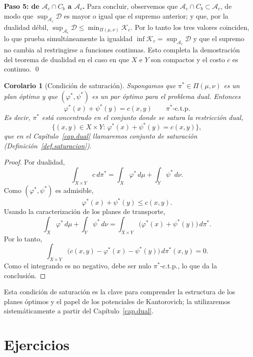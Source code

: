 \documentclass[12pt, a4paper]{amsbook}
\newcommand{\D}{{\mathcal D}}
\newtheorem{cor}[teo]{Corolario}
\theoremstyle{remark}
\theoremstyle{definition}
\numberwithin{section}{chapter}
\numberwithin{subsection}{section}
\numberwithin{equation}{section}
\numberwithin{figure}{chapter}
\begin{document}
\medskip\noindent\textbf{Paso 5: de $\mathcal A_c\cap C_b$ a $\mathcal A_c$.}
Para concluir, observemos que $\mathcal A_c\cap C_b\subset\mathcal A_c$,
de modo que $\sup_{\mathcal A_c}\D$ es mayor o igual que el supremo anterior;
y que, por la dualidad débil, $\sup_{\mathcal A_c}\D\le\min_{\Pi(\mu,\nu)}\mathcal K_c$.
Por lo tanto los tres valores coinciden, lo que prueba simultáneamente la
igualdad $\inf\mathcal K_c=\sup_{\mathcal A_c}\D$ y que el supremo no cambia
al restringirse a funciones continuas. Esto completa la demostración del
teorema de dualidad en el caso en que $X$ e $Y$ son compactos y el costo $c$
es continuo.
\qed

\begin{cor}[Condición de saturación]\label{cor:saturacion}
Supongamos que $\pi^*\in\Pi(\mu,\nu)$ es un plan óptimo y que
$(\varphi^*,\psi^*)$ es un par óptimo para el problema dual. Entonces
\[
\varphi^*(x)+\psi^*(y)=c(x,y)
\qquad \pi^*\text{-c.t.p.}
\]
Es decir, $\pi^*$ está concentrado en el conjunto donde se satura la
restricción dual,
\[
\bigl\{(x,y)\in X\times Y:\,
\varphi^*(x)+\psi^*(y)=c(x,y)\bigr\},
\]
que en el Capítulo~\ref{cap.dual} llamaremos \emph{conjunto de saturación}
(Definición~\ref{def.saturacion}).
\end{cor}

\begin{proof}
Por dualidad,
\[
\int_{X\times Y}c\,d\pi^*
=
\int_X\varphi^*\,d\mu
+
\int_Y\psi^*\,d\nu.
\]
Como $(\varphi^*,\psi^*)$ es admisible,
\[
\varphi^*(x)+\psi^*(y)\leq c(x,y).
\]
Usando la caracterización de los planes de transporte,
\[
\int_X\varphi^*\,d\mu+\int_Y\psi^*\,d\nu
=
\int_{X\times Y}
\bigl(\varphi^*(x)+\psi^*(y)\bigr)\,d\pi^*.
\]
Por lo tanto,
\[
\int_{X\times Y}
\bigl(c(x,y)-\varphi^*(x)-\psi^*(y)\bigr)
\,d\pi^*(x,y)
=0.
\]
Como el integrando es no negativo, debe ser nulo $\pi^*$-c.t.p., lo que da la conclusión.
\end{proof}

Esta condición de saturación es la clave para comprender la estructura de los
planes óptimos y el papel de los potenciales de Kantorovich; la utilizaremos
sistemáticamente a partir del Capítulo~\ref{cap.dual}.


\section*{Ejercicios}
\end{document}
